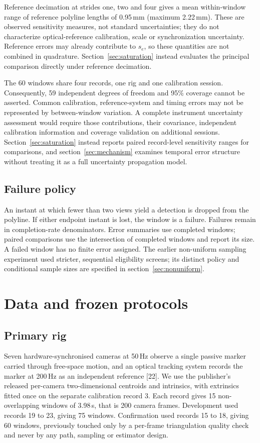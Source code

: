 \documentclass{iopjournal}
\begin{document}
Reference decimation at strides one, two and four gives a mean within-window
range of reference polyline lengths of 0.95\,mm (maximum 2.22\,mm). These
are observed sensitivity measures, not standard uncertainties; they do not
characterize optical-reference calibration, scale or synchronization uncertainty. Reference errors may already contribute to $s_e$, so these
quantities are not combined in quadrature. Section~\ref{sec:saturation}
instead evaluates the principal comparison directly under reference decimation.

The 60 windows share four records, one rig and one calibration session.
Consequently, 59 independent degrees of freedom and 95\% coverage cannot be
asserted. Common calibration, reference-system and timing errors may not be
represented by between-window variation. A complete instrument uncertainty
assessment would require those contributions, their covariance, independent
calibration information and coverage validation on additional sessions.
Section~\ref{sec:saturation} instead reports paired record-level sensitivity
ranges for comparisons, and section~\ref{sec:mechanism} examines temporal
error structure without treating it as a full uncertainty propagation model.

\subsection{Failure policy}
An instant at which fewer than two views yield a detection is dropped from the
polyline. If either endpoint instant is lost, the window is a failure.
Failures remain in completion-rate denominators. Error summaries use
completed windows; paired comparisons use the intersection of completed
windows and report its size. A failed window has no finite error assigned.
The earlier non-uniform sampling experiment used stricter, sequential
eligibility screens; its distinct policy and conditional sample sizes are
specified in section~\ref{sec:nonuniform}.

\section{Data and frozen protocols}
\label{sec:data}

\subsection{Primary rig}
Seven hardware-synchronised cameras at 50\,Hz observe a single passive marker
carried through free-space motion, and an optical tracking system records the
marker at 200\,Hz as an independent reference [22]. We use the publisher's
released per-camera two-dimensional centroids and intrinsics, with extrinsics
fitted once on the separate calibration record 3. Each record gives 15 non-overlapping windows
of 3.98\,s, that is 200 camera frames. Development used records 19 to 23,
giving 75 windows. Confirmation used records 15 to 18, giving 60 windows,
previously touched only by a per-frame triangulation quality check and never
by any path, sampling or estimator design.
\end{document}
